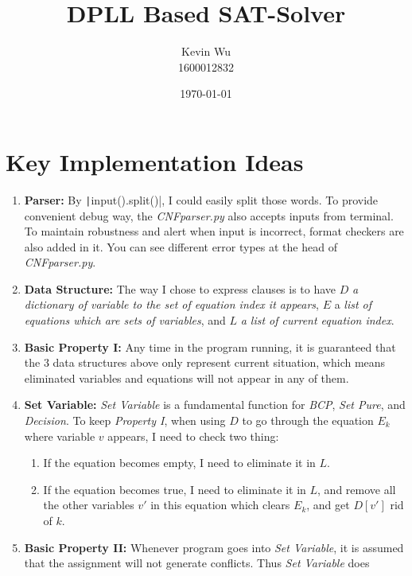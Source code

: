 \documentclass[a4paper,10pt]{article}
\title{DPLL Based SAT-Solver}
\author{Kevin Wu\\1600012832}
\date{\today}
\begin{document}
\maketitle
\vspace{-20pt}
\section{Key Implementation Ideas}
\begin{enumerate}
\setlength{\itemsep}{.1em}
\item \textbf{Parser:} By \texttt|input().split()|,
    I could easily split those words. To provide convenient debug 
    way, the \textit{CNFparser.py} also accepts inputs from terminal.
    To maintain robustness and alert when input is incorrect,
    format checkers are also added in it.
    You can see different error types at the head of \textit{CNFparser.py}.
\item \textbf{Data Structure:} The way I chose to express clauses is to have $D$  
    \textit{a dictionary of variable to the set of equation index it appears}, $E$ a 
    \textit{list of equations which are sets of variables}, and $L$ \textit{a list of current
    equation index}.
\item \textbf{Basic Property I:} Any time in the program running, it is guaranteed
    that the $3$ data structures above
    only represent current situation, which means eliminated variables and 
    equations will not appear in any of them.
\item \textbf{Set Variable:} \textit{Set Variable} is a fundamental function for \textit{BCP},
    \textit{Set Pure}, and \textit{Decision}.
    To keep \textit{Property I}, when using $D$ to go through
    the equation $E_k$ where variable $v$ appears,
    I need to check two thing: 
    \begin{enumerate}
        \small\setlength{\itemsep}{.1em}
        \item If the equation becomes empty, I need to eliminate it in $L$.
        \item If the equation becomes true, I need to eliminate it in $L$,
            and remove all the other variables $v'$ in this equation which clears $E_k$,
            and get $D[v']$ rid of $k$.
    \end{enumerate}
\item \textbf{Basic Property II:} Whenever program goes into \textit{Set Variable}, it is 
    assumed that the assignment will not generate conflicts. Thus \textit{Set Variable} does

\end{enumerate}
\end{document}
